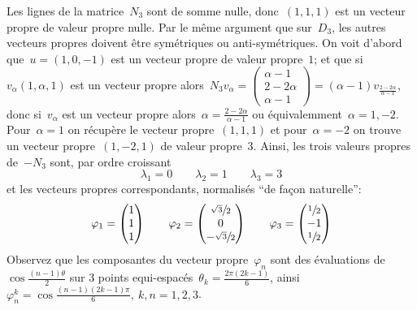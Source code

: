 \clearpage


Les lignes de la matrice~$N_3$ sont de somme nulle, donc~$(1,1,1)$ est un
vecteur propre de valeur propre nulle.  Par le même argument que sur~$D_3$, les
autres vecteurs propres doivent être symétriques ou anti-symétriques.  On voit
d'abord que~$u=(1,0,-1)$ est un vecteur propre de valeur propre~$1$; et que
si~$v_\alpha(1,\alpha,1)$ est un vecteur propre alors~$N_3v_\alpha=
\left(\begin{smallmatrix}\alpha-1\\2-2\alpha\\\alpha-1\end{smallmatrix}\right)=(\alpha-1)v_{\frac{2-2\alpha}{\alpha-1}}$,
donc si~$v_\alpha$ est un vecteur propre
alors~$\alpha=\frac{2-2\alpha}{\alpha-1}$ ou équivalemment~$\alpha=1,-2$.
Pour~$\alpha=1$ on récupère le vecteur propre~$(1,1,1)$ et pour~$\alpha=-2$ on
trouve un vecteur propre~$(1,-2,1)$ de valeur propre~$3$.
Ainsi, les trois valeurs
propres de~$-N_3$ sont, par ordre croissant
\[
	\lambda_1 = 0
	\qquad
	\lambda_2 = 1
	\qquad
	\lambda_3 = 3
\]
et les vecteurs propres correspondants, normalisés ``de façon naturelle'':
\[
	\varphi_1=\begin{pmatrix}
		1\\
		1\\
		1
	\end{pmatrix}
	\qquad
	\varphi_2=\begin{pmatrix}
		\sfrac{\sqrt3}2\\
		0\\
		-\sfrac{\sqrt3}2
	\end{pmatrix}
	\qquad
	\varphi_3=\begin{pmatrix}
		\sfrac12\\
		-1\\
		\sfrac12\\
	\end{pmatrix}
\]
Observez que les composantes du vecteur propre~$\varphi_n$ sont des évaluations
de~$\cos\tfrac{(n-1)\theta}2$ sur 3 points
equi-espacés~$\theta_k=\tfrac{2\pi(2k-1)}6$,
ainsi~$\varphi_n^k=\cos\frac{(n-1)(2k-1)\pi}6,\ k,\!n=1,2,3$.

